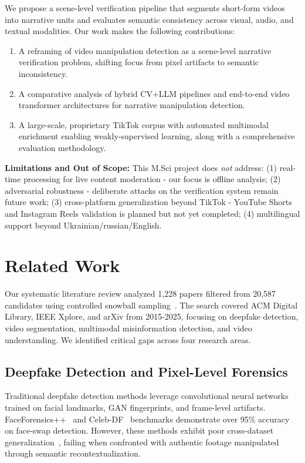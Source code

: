 \documentclass[runningheads]{llncs}
\begin{document}
We propose a scene-level verification pipeline that segments short-form videos into narrative units and evaluates semantic consistency across visual, audio, and textual modalities. Our work makes the following contributions:

\begin{enumerate}
\item A reframing of video manipulation detection as a scene-level narrative verification problem, shifting focus from pixel artifacts to semantic inconsistency.
\item A comparative analysis of hybrid CV+LLM pipelines and end-to-end video transformer architectures for narrative manipulation detection.
\item A large-scale, proprietary TikTok corpus with automated multimodal enrichment enabling weakly-supervised learning, along with a comprehensive evaluation methodology.
\end{enumerate}

\textbf{Limitations and Out of Scope:} This M.Sci project does \textit{not} address: (1) real-time processing for live content moderation - our focus is offline analysis; (2) adversarial robustness - deliberate attacks on the verification system remain future work; (3) cross-platform generalization beyond TikTok - YouTube Shorts and Instagram Reels validation is planned but not yet completed; (4) multilingual support beyond Ukrainian/russian/English.

\section{Related Work}

Our systematic literature review analyzed 1,228 papers filtered from 20,587 candidates using controlled snowball sampling~\cite{snowball_sampling}. The search covered ACM Digital Library, IEEE Xplore, and arXiv from 2015-2025, focusing on deepfake detection, video segmentation, multimodal misinformation detection, and video understanding. We identified critical gaps across four research areas.

\subsection{Deepfake Detection and Pixel-Level Forensics}

Traditional deepfake detection methods leverage convolutional neural networks trained on facial landmarks, GAN fingerprints, and frame-level artifacts. FaceForensics++~\cite{faceforensics} and Celeb-DF~\cite{celebdf} benchmarks demonstrate over 95\% accuracy on face-swap detection. However, these methods exhibit poor cross-dataset generalization~\cite{deepfake_generalization}, failing when confronted with authentic footage manipulated through semantic recontextualization.
\end{document}

